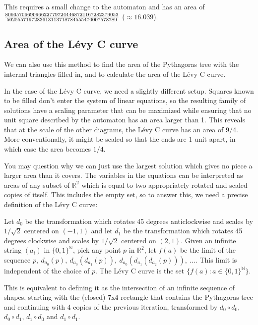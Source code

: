 \documentclass{article}
\newcommand{\bounding}{
\draw[tsty] (-2.5,1) -- (-1.5,0) -- (2.5,0) -- (3.5,1) -- (3.5,2.5) -- (2,4) -- (-1,4) -- (-2.5, 2.5) -- cycle;
}
\newcommand{\subt}[2]{
    \begin{scope}[yshift=1cm,rotate=45,scale=0.7071]
        #1
    \end{scope}
    \begin{scope}[xshift=0.5cm,yshift=1.5cm,rotate=-45,scale=0.7071]
        #2
    \end{scope}
}
\newcommand{\dup}[1]{\subt{#1}{#1}}
\newcommand{\gtree}[3]{
	#2
	\ifthenelse{#1<2}{
		#3
	}{
		\dup{\gtree{\the\numexpr#1-1}{#2}{#3}}
	}
}
\begin{document}
This requires a small change to the automaton and has an area of $80605706690966227797244468721167282379053\over 5025557197283613113718784555470007578789$ ($\approx 16.039$).

\subsection{Area of the Lévy C curve}
We can also use this method to find the area of the Pythagoras tree with the internal triangles filled in, and to calculate the area of the Lévy C curve.

In the case of the Lévy C curve, we need a slightly different setup. Squares known to be filled don't enter the system of linear equations, so the resulting family of solutions have a scaling parameter that can be maximized while ensuring that no unit square described by the automaton has an area larger than 1. This reveals that at the scale of the other diagrams, the Lévy C curve has an area of $9/4$. More conventionally, it might be scaled so that the ends are 1 unit apart, in which case the area becomes $1/4$.


You may question why we can just use the largest solution which gives no piece a larger area than it covers. The variables in the equations can be interpreted as areas of any subset of $\mathbb{R}^2$ which is equal to two appropriately rotated and scaled copies of itself. This includes the empty set, so to answer this, we need a precise definition of the Lévy C curve:

Let $d_0$ be the transformation which rotates 45 degrees anticlockwise and scales by $1/\sqrt{2}$ centered on $(-1,1)$
and let $d_1$ be the transformation which rotates 45 degrees clockwise and scales by $1/\sqrt{2}$ centered on $(2,1)$.
Given an infinite string $(a_i)$ in $\{0,1\}^\mathbb{N}$, pick any point $p$ in $\mathbb{R}^2$, let $f(a)$ be the limit of the sequence $p,\ d_{a_0}(p),\ d_{a_0}(d_{a_1}(p)),\ d_{a_0}(d_{a_1}(d_{a_2}(p))),\ \dots$. This limit is independent of the choice of $p$. The Lévy C curve is the set  $\{f(a) : a \in \{0,1\}^\mathbb{N}\}$.

This is equivalent to defining it as the intersection of an infinite sequence of shapes, starting with the (closed) 7x4 rectangle that contains the Pythagoras tree and continuing  with 4 copies of the previous iteration, transformed by $d_0\circ d_0$, $d_0\circ d_1$, $d_1\circ d_0$ and $d_1\circ d_1$. 
\end{document}
